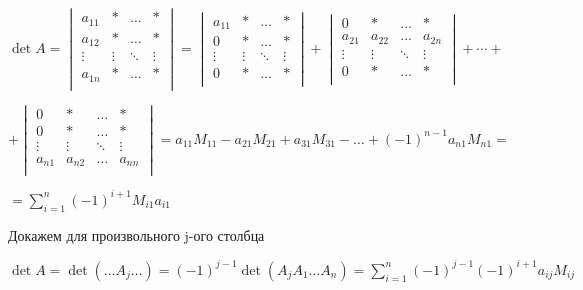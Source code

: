\begin{enumerate}
          \(\det A =
          \begin{vmatrix}
              a_{11} & *      & \ldots & *      \\
              a_{12} & *      & \ldots & *      \\
              \vdots & \vdots & \ddots & \vdots \\
              a_{1n} & *      & \ldots & *      \\
          \end{vmatrix} =
          \begin{vmatrix}
              a_{11} & *      & \ldots & *      \\
              0      & *      & \ldots & *      \\
              \vdots & \vdots & \ddots & \vdots \\
              0      & *      & \ldots & *      \\
          \end{vmatrix} +
          \begin{vmatrix}
              0      & *      & \ldots & *      \\
              a_{21} & a_{22} & \ldots & a_{2n} \\
              \vdots & \vdots & \ddots & \vdots \\
              0      & *      & \ldots & *      \\
          \end{vmatrix} + \cdots +\)

          \(+
          \begin{vmatrix}
              0      & *      & \ldots & *      \\
              0      & *      & \ldots & *      \\
              \vdots & \vdots & \ddots & \vdots \\
              a_{n1} & a_{n2} & \ldots & a_{nn} \\
          \end{vmatrix} = a_{11} M_{11} - a_{21} M_{21} + a_{31} M_{31} - \ldots + (-1)^{n-1} a_{n1} M_{n1} =\)

          \(= \sum\limits_{i = 1}^n (-1)^{i + 1} M_{i1} a_{i1}\)


          Докажем для произвольного j-ого столбца

          \(\det A = \det (\ldots A_j \ldots) = (-1)^{j-1} \det (A_j A_1 \ldots A_n) = \sum\limits_{i=1}^n(-1)^{j-1}(-1)^{i+1} a_{ij} M_{ij}\)





\end{enumerate}
